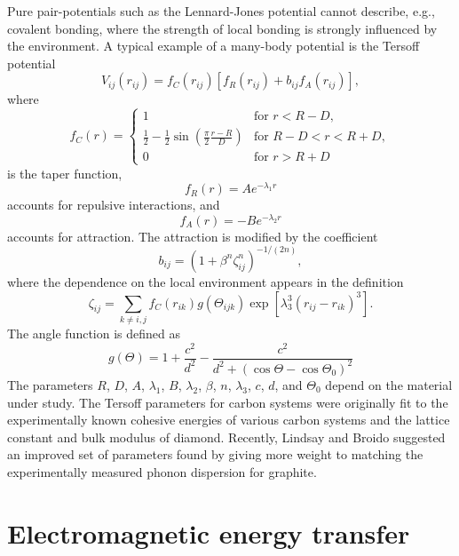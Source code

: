 Pure pair-potentials such as the Lennard-Jones potential cannot describe, e.g., covalent bonding, where the strength of local bonding is strongly influenced by the environment. A typical example of a many-body potential is the Tersoff potential
\begin{equation}
 V_{ij}(r_{ij}) = f_C(r_{ij}) \left[f_R(r_{ij}) + b_{ij}f_A(r_{ij}) \right],
\end{equation}
where 
\begin{equation}
 f_C ( r) = \left\{ \begin{array}{ll}
                     1 & \textrm{for } r<R-D,\\
		     \frac{1}{2}-\frac{1}{2}\sin\left(\frac{\pi}{2}\frac{r-R}{D} \right) & \textrm{for } R-D < r < R+D, \\
		     0 & \textrm{for } r>R+D
                    \end{array}
 \right.
\end{equation}
is the taper function, 
\begin{equation}
 f_R(r) = A e^{-\lambda_1 r}
\end{equation}
accounts for repulsive interactions, and
\begin{equation}
 f_A(r) = -B e^{-\lambda_2 r}
\end{equation}
 accounts for attraction. The attraction is modified by the coefficient
\begin{equation}
 b_{ij} = \left( 1+\beta^n \zeta_{ij}^n \right)^{-1/(2n)},
\end{equation}
where the dependence on the local environment appears in the definition 
\begin{equation}
 \zeta_{ij} = \sum_{k\neq i,j} f_C(r_{ik}) g(\Theta_{ijk}) \exp\left[\lambda_3^3(r_{ij}-r_{ik})^3 \right] .
\end{equation}
The angle function is defined as 
\begin{equation}
 g(\Theta) = 1 + \frac{c^2}{d^2} - \frac{c^2}{d^2 + (\cos \Theta-\cos \Theta_0)^2}
\end{equation}
The parameters $R$, $D$, $A$, $\lambda_1$, $B$, $\lambda_2$, $\beta$, $n$, $\lambda_3$, $c$, $d$, and $\Theta_0$ depend on the material under study. The Tersoff parameters for carbon systems were originally fit to the experimentally known cohesive energies of various carbon systems and the lattice constant and bulk modulus of diamond. Recently, Lindsay and Broido suggested an improved set of parameters found by giving more weight to matching the experimentally measured phonon dispersion for graphite. 

\section{Electromagnetic energy transfer}